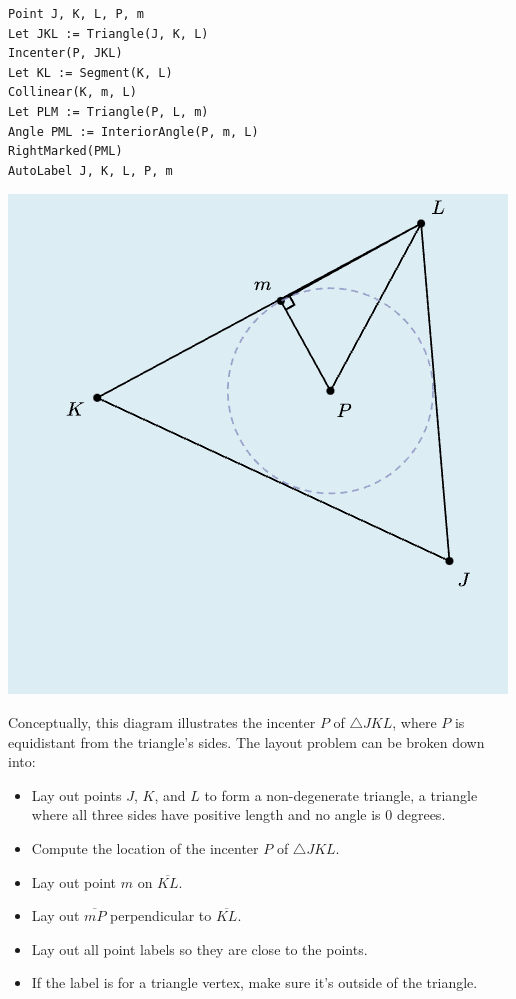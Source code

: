 \vspace{1em}
\begin{minipage}{.5\linewidth}
\begin{mdframed}[style=SUBCode]
\begin{lstlisting}[language=Sub-geom,escapechar=@]
Point J, K, L, P, m
Let JKL := Triangle(J, K, L)
Incenter(P, JKL)
Let KL := Segment(K, L)
Collinear(K, m, L)
Let PLM := Triangle(P, L, m)
Angle PML := InteriorAngle(P, m, L)
RightMarked(PML)
AutoLabel J, K, L, P, m
\end{lstlisting}
\end{mdframed}
\end{minipage}\hfill
\begin{minipage}{.4\linewidth}
   \includegraphics[width=\linewidth]{assets/penrose/Triangle Incenter.png} 
\end{minipage}
\vspace{1em}

Conceptually, this diagram illustrates the incenter $P$ of $\triangle JKL$, where $P$ is equidistant from the triangle's sides. The layout problem can be broken down into:

\begin{itemize}
    \item  Lay out points $J$, $K$, and $L$ to form a non-degenerate triangle, a triangle where all three sides have positive length and no angle is $0$ degrees. 
    \item  Compute the location of the incenter $P$ of $\triangle JKL$.
    \item Lay out point $m$ on $\overline{KL}$.
    \item Lay out $\overline{mP}$ perpendicular to $\overline{KL}$.
    \item Lay out all point labels so they are close to the points.
    \item If the label is for a triangle vertex, make sure it's outside of the triangle.
\end{itemize}


